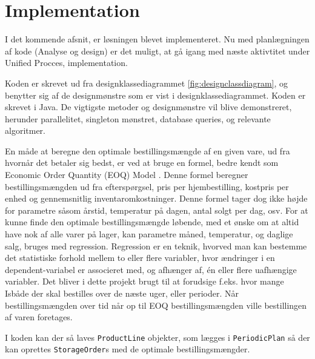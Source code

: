 \chapter{Implementation}\label{ch:implementation}
I det kommende afsnit, er løsningen blevet implementeret. Nu med planlægningen af kode (Analyse og design) er det muligt, at gå igang med næste aktivtitet under Unified Procces, implementation\cite{UnifiedProcess}. 

Koden er skrevet ud fra designklassediagrammet \ref{fig:designclassdiagram}, og benytter sig af de designmønstre som er vist i designklassediagrammet. Koden er skrevet i Java. 
De vigtigste metoder og designmønstre vil blive demonstreret, herunder parallelitet, singleton mønstret, database queries, og relevante algoritmer.



En måde at beregne den optimale bestillingsmængde af en given vare, ud fra hvornår det betaler sig bedst, er ved at bruge en formel, bedre kendt som Economic Order Quantity (EOQ) Model \cite{EOQ}. Denne formel beregner bestillingsmængden ud fra efterspørgsel, pris per hjembestilling, kostpris per enhed og gennemsnitlig inventaromkostninger. Denne formel tager dog ikke højde for parametre såsom årstid, temperatur på dagen, antal solgt per dag, osv. For at kunne finde den optimale bestillingsmængde løbende, med et ønske om at altid have nok af alle varer på lager, kan parametre måned, temperatur, og daglige salg, bruges med regression. Regression er en teknik, hvorved man kan bestemme det statistiske forhold mellem to eller flere variabler, hvor ændringer i en dependent-variabel er associeret med, og afhænger af, én eller flere uafhængige variabler. Det bliver i dette projekt brugt til at forudsige f.eks. hvor mange Isbåde\cite{Isbåd} der skal bestilles over de næste uger, eller perioder. Når bestillingsmængden over tid når op til EOQ bestillingsmængden ville bestillingen af varen foretages.


I koden kan der så laves \verb|ProductLine| objekter, som lægges i \verb|PeriodicPlan| så der kan oprettes \verb|StorageOrder|s med de optimale bestillingsmængder. 
